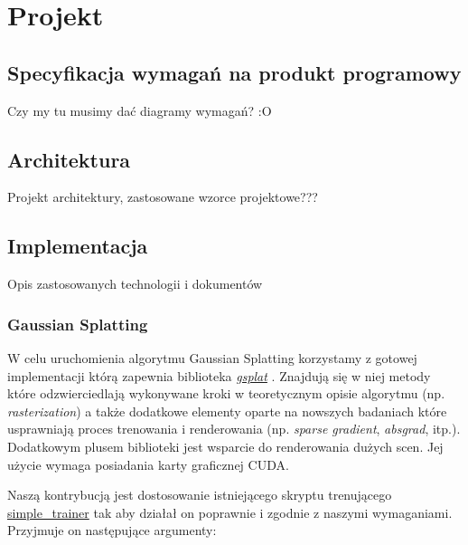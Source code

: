\section{Projekt}
\subsection{Specyfikacja wymagań na produkt programowy}
Czy my tu musimy dać diagramy wymagań? :O
\subsection{Architektura}
Projekt architektury, zastosowane wzorce projektowe???
\subsection{Implementacja}
Opis zastosowanych technologii i dokumentów

\subsubsection{Gaussian Splatting}
W celu uruchomienia algorytmu Gaussian Splatting korzystamy z gotowej implementacji którą 
zapewnia biblioteka \href{https://docs.gsplat.studio/main/index.html}{\textit{gsplat}} \cite{ye2024gsplatopensourcelibrarygaussian}. Znajdują się w niej metody które odzwierciedlają wykonywane kroki w teoretycznym opisie algorytmu (np. \textit{rasterization}) a także dodatkowe elementy oparte na nowszych badaniach które usprawniają proces trenowania i renderowania (np. \textit{sparse gradient}, \textit{absgrad}, itp.). Dodatkowym plusem biblioteki jest wsparcie do renderowania dużych scen. Jej użycie wymaga posiadania karty graficznej CUDA.  

Naszą kontrybucją jest dostosowanie istniejącego skryptu trenującego \href{https://github.com/nerfstudio-project/gsplat/blob/main/examples/simple_trainer.py}{simple\_trainer} tak aby działał on poprawnie i zgodnie z naszymi wymaganiami. Przyjmuje on następujące argumenty:

